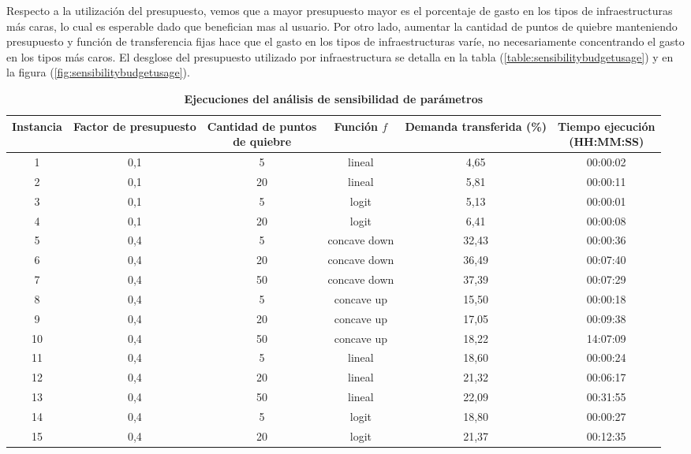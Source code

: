 \documentclass{article}
\begin{document}
  Respecto a la utilización del presupuesto, vemos que a mayor presupuesto mayor es el porcentaje de gasto en los tipos de infraestructuras más caras, lo cual es esperable dado que benefician mas al usuario. Por otro lado, aumentar la cantidad de puntos de quiebre manteniendo presupuesto y función de transferencia fijas hace que el gasto en los tipos de infraestructuras varíe, no necesariamente concentrando el gasto en los tipos más caros. El desglose del presupuesto utilizado por infraestructura se detalla en la tabla (\ref{table:sensibilitybudgetusage}) y en la figura (\ref{fig:sensibilitybudgetusage}).

  \begin{table}
    \centering
    \caption*{{\bf Ejecuciones del análisis de sensibilidad de parámetros}}
    \begin{tabular}{cccccc}
        \toprule
        Instancia & Factor de presupuesto & \shortstack{Cantidad de puntos \\ de quiebre} & Función $f$ & Demanda transferida (\%) & \shortstack{Tiempo ejecución \\ (HH:MM:SS)} \\
        \midrule
        1 & 0,1 & 5 & lineal & 4,65 & 00:00:02 \\
        2 & 0,1 & 20 & lineal & 5,81 & 00:00:11 \\
        3 & 0,1 & 5 & logit & 5,13 & 00:00:01 \\
        4 & 0,1 & 20 & logit & 6,41 & 00:00:08 \\
        5 & 0,4 & 5 & concave down & 32,43 & 00:00:36 \\
        6 & 0,4 & 20 & concave down & 36,49 & 00:07:40 \\
        7 & 0,4 & 50 & concave down & 37,39 & 00:07:29 \\
        8 & 0,4 & 5 & concave up & 15,50 & 00:00:18 \\
        9 & 0,4 & 20 & concave up & 17,05 & 00:09:38 \\
        10 & 0,4 & 50 & concave up & 18,22 & 14:07:09 \\
        11 & 0,4 & 5 & lineal & 18,60 & 00:00:24 \\
        12 & 0,4 & 20 & lineal & 21,32 & 00:06:17 \\
        13 & 0,4 & 50 & lineal & 22,09 & 00:31:55 \\
        14 & 0,4 & 5 & logit & 18,80 & 00:00:27 \\
        15 & 0,4 & 20 & logit & 21,37 & 00:12:35 \\

\end{tabular}
\end{table}
\end{document}
